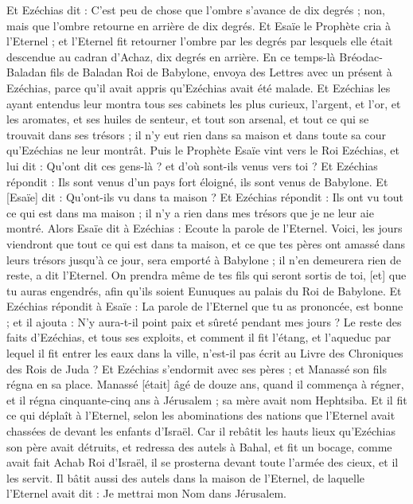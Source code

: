 \begin{multicols}{2}
Et Ezéchias dit : C'est peu de chose que l'ombre s'avance de dix degrés ; non, mais que l'ombre retourne en arrière de dix degrés.
Et Esaïe le Prophète cria à l'Eternel ; et l'Eternel fit retourner l'ombre par les degrés par lesquels elle était descendue au cadran d'Achaz, dix degrés en arrière.
En ce temps-là Bréodac-Baladan fils de Baladan Roi de Babylone, envoya des Lettres avec un présent à Ezéchias, parce qu'il avait appris qu'Ezéchias avait été malade.
Et Ezéchias les ayant entendus leur montra tous ses cabinets les plus curieux, l'argent, et l'or, et les aromates, et ses huiles de senteur, et tout son arsenal, et tout ce qui se trouvait dans ses trésors ; il n'y eut rien dans sa maison et dans toute sa cour qu'Ezéchias ne leur montrât.
Puis le Prophète Esaïe vint vers le Roi Ezéchias, et lui dit : Qu'ont dit ces gens-là ? et d'où sont-ils venus vers toi ? Et Ezéchias répondit : Ils sont venus d'un pays fort éloigné, ils sont venus de Babylone.
Et [Esaïe] dit : Qu'ont-ils vu dans ta maison ? Et Ezéchias répondit : Ils ont vu tout ce qui est dans ma maison ; il n'y a rien dans mes trésors que je ne leur aie montré.
Alors Esaïe dit à Ezéchias : Ecoute la parole de l'Eternel.
Voici, les jours viendront que tout ce qui est dans ta maison, et ce que tes pères ont amassé dans leurs trésors jusqu'à ce jour, sera emporté à Babylone ; il n'en demeurera rien de reste, a dit l'Eternel.
On prendra même de tes fils qui seront sortis de toi, [et] que tu auras engendrés, afin qu'ils soient Eunuques au palais du Roi de Babylone.
Et Ezéchias répondit à Esaïe : La parole de l'Eternel que tu as prononcée, est bonne ; et il ajouta : N'y aura-t-il point paix et sûreté pendant mes jours ?
Le reste des faits d'Ezéchias, et tous ses exploits, et comment il fit l'étang, et l'aqueduc par lequel il fit entrer les eaux dans la ville, n'est-il pas écrit au Livre des Chroniques des Rois de Juda ?
Et Ezéchias s'endormit avec ses pères ; et Manassé son fils régna en sa place.
\VerseOne{}Manassé [était] âgé de douze ans, quand il commença à régner, et il régna cinquante-cinq ans à Jérusalem ; sa mère avait nom Hephtsiba.
Et il fit ce qui déplaît à l'Eternel, selon les abominations des nations que l'Eternel avait chassées de devant les enfants d'Israël.
Car il rebâtit les hauts lieux qu'Ezéchias son père avait détruits, et redressa des autels à Bahal, et fit un bocage, comme avait fait Achab Roi d'Israël, il se prosterna devant toute l'armée des cieux, et il les servit.
Il bâtit aussi des autels dans la maison de l'Eternel, de laquelle l'Eternel avait dit : Je mettrai mon Nom dans Jérusalem.

\end{multicols}
